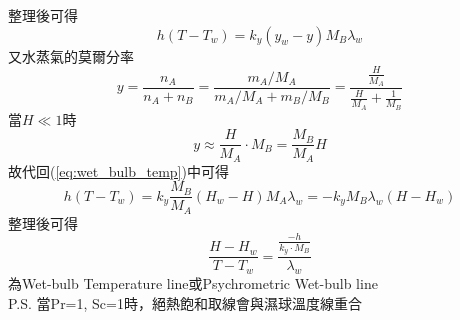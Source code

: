 \documentclass[../main.tex]{subfiles}
\begin{document}
\begin{itemize}
\begin{enumerate}
    整理後可得
    \begin{equation}
      h(T - T_w) = k_y(y_w - y)M_B\lambda_w \label{eq:wet_bulb_temp}
    \end{equation}
    又水蒸氣的莫爾分率
    \begin{equation}
      y = \frac{n_A}{n_A+n_B} = \frac{m_A/M_A}{m_A/M_A + m_B/M_B} = 
      \frac{\frac{H}{M_A}}{\frac{H}{M_A} + \frac{1}{M_B}}
    \end{equation}
    當$H\ll 1$時
    \begin{equation}
      y \approx \frac{H}{M_A} \cdot M_B = \frac{M_B}{M_A}H
    \end{equation}
    故代回(\ref{eq:wet_bulb_temp})中可得
    \begin{equation}
      h(T-T_w) = k_y \frac{M_B}{M_A}(H_w -H) M_A\lambda_w = -k_y M_B \lambda_w (H - H_w)
    \end{equation}
    整理後可得
    \begin{equation}
      \boxed{\frac{H - H_w}{T - T_w} = \frac{\frac{-h}{k_y\cdot M_B}}{\lambda_w}}
    \end{equation}
    為Wet-bulb Temperature line或Psychrometric Wet-bulb line\\
    P.S. 當Pr=1, Sc=1時，絕熱飽和取線會與濕球溫度線重合
  \end{enumerate}
\end{itemize}
\end{document}
